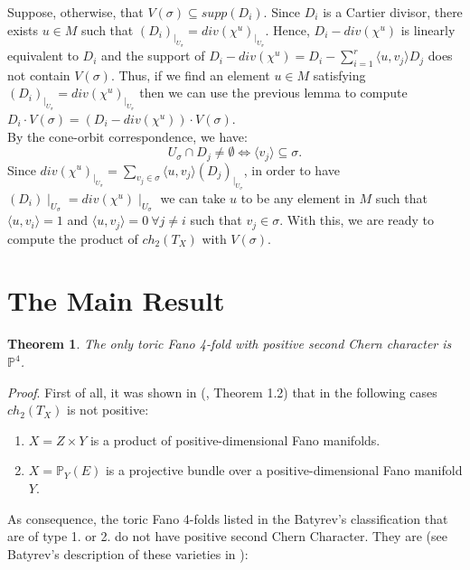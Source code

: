 \documentclass[10pt]{article}
\newtheorem{teo}{Theorem}[section]
\begin{document}
Suppose, otherwise, that $V(\sigma)\subseteq supp(D_i)$. Since $D_i$ is a Cartier divisor, there exists $u\in M$ such that $(D_i)_{\mid_{U_{\sigma}}}=div (\chi^ u)_{\mid_{U_{\sigma}}}$. Hence,  $D_i-div(\chi^u)$ is linearly equivalent to  $D_i$ and the support of $D_i - div(\chi^u)=D_i - \displaystyle \sum_{i=1}^{r}\langle u,v_j\rangle D_j$ does not contain $V(\sigma)$. Thus, if we find an element $u\in M$ satisfying $(D_i)_{\mid_{U_{\sigma}}}=div (\chi^ u)_{\mid_{U_{\sigma}}}$ then we can use the previous lemma to compute $D_i \cdot V(\sigma)=(D_i-div(\chi^ u)) \cdot V(\sigma)$.\\
By the cone-orbit correspondence, we have:
$$U_{\sigma}\cap D_j \neq \emptyset \Leftrightarrow \langle v_j\rangle \subseteq \sigma.$$
Since $div (\chi^ u)_{\mid_{U_{\sigma}}}=\displaystyle \sum_{v_j \in \sigma}\langle u,v_j\rangle (D_j)_{\mid_{U_{\sigma}}}$, in order to have $(D_i)\mid_{U_{\sigma}}=div(\chi^u)\mid_{U_{\sigma}}$ we can take $u$ to be any element in $M$ such that $\langle u,v_i\rangle =1$ and $\langle u,v_j\rangle =0 \ \forall j \neq i$ such that $v_j \in \sigma$. With this, we are ready to compute the product of $ch_2(T_X)$ with $V(\sigma)$.\\


\section{The Main Result}


\begin{teo} The only toric Fano 4-fold with positive second Chern character is $\mathbb{P}^4$.
\end{teo}

\textit{Proof}. First of all, it was shown in (\cite{jason}, Theorem 1.2) that in the following cases $ch_2(T_X)$ is not positive: 

\begin{enumerate}
\item $X=Z\times Y$ is a product of positive-dimensional Fano manifolds.
\item $X=\mathbb{P}_Y(E)$ is a projective bundle  over a positive-dimensional Fano manifold $Y$.
\end{enumerate}


As consequence, the toric Fano 4-folds listed in the Batyrev's classification that are of type 1. or 2. do not have positive second Chern Character. They are (see Batyrev's description of these varieties in \cite{bat}):\\
 
\end{document}

